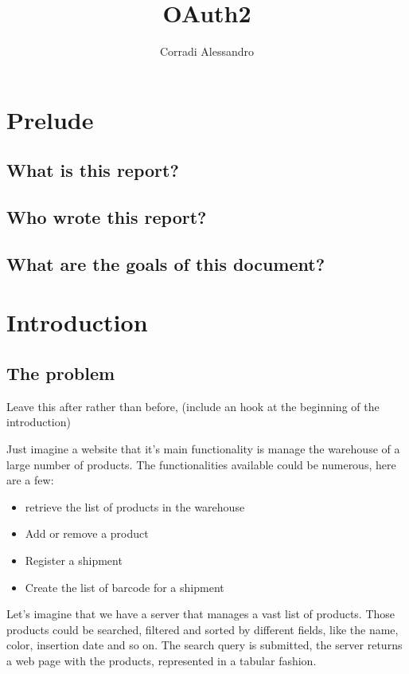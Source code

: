 \documentclass{style}
\title{OAuth2}
\author{Corradi Alessandro}
\begin{document}
\maketitle{}
\tableofcontents
\clearpage
{}


\section{Prelude}
\subsection{What is this report?}
\subsection{Who wrote this report?}
\subsection{What are the goals of this document?}

\section{Introduction}

\subsection{The problem}
Leave this after rather than before, (include an hook at the beginning of the
introduction)

Just imagine a website that it's main functionality is manage the warehouse of a
large number of products.
The functionalities available could be numerous, here are a few:

\begin{itemize}
    \item retrieve the list of products in the warehouse
    \item Add or remove a product
    \item Register a shipment
    \item Create the list of barcode for a shipment
\end{itemize}



Let's imagine that we have a server that manages a vast list of products. Those
products could be searched, filtered and sorted by different fields, like the
name, color, insertion date and so on.  The search query is submitted, the
server returns a web page with the products, represented in a tabular fashion.
\end{document}
